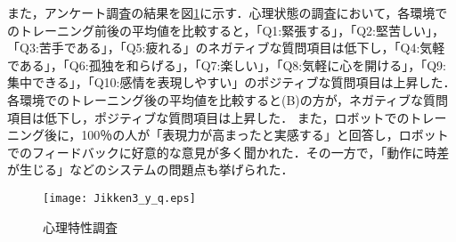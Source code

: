 \documentclass[twocolumn,a4j]{jarticle}
\begin{document}
また，アンケート調査の結果を図\ref{Jikken3_Q1}に示す．心理状態の調査において，各環境でのトレーニング前後の平均値を比較すると，「Q1:緊張する」，「Q2:堅苦しい」，「Q3:苦手である」，「Q5:疲れる」のネガティブな質問項目は低下し，「Q4:気軽である」，「Q6:孤独を和らげる」，「Q7:楽しい」，「Q8:気軽に心を開ける」，「Q9:集中できる」，「Q10:感情を表現しやすい」のポジティブな質問項目は上昇した．各環境でのトレーニング後の平均値を比較すると(B)の方が，ネガティブな質問項目は低下し，ポジティブな質問項目は上昇した．
また，ロボットでのトレーニング後に，100$％$の人が「表現力が高まったと実感する」と回答し，ロボットでのフィードバックに好意的な意見が多く聞かれた．その一方で，「動作に時差が生じる」などのシステムの問題点も挙げられた．


\begin{figure}[h]
\begin{center}
\texttt{[image: Jikken3\_y\_q.eps]}
\end{center}
\vspace{-8mm}
\caption{心理特性調査}
\label{Jikken3_Q1} %
\end{figure}
\vspace{-9mm}

\end{document}
